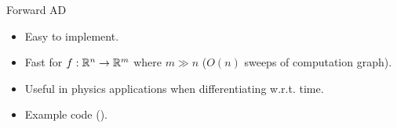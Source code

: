 \begin{frame}{Forward AD}
\begin{itemize}
    \item Easy to implement.
    \item Fast for $f:\mathbb{R}^n \to \mathbb{R}^m$ where $m \gg n$ ($O(n)$ sweeps of computation graph).
    \item Useful in physics applications when differentiating w.r.t. time.
    \item Example code (\href{https://github.com/JamesYang007/FastAD-Report/blob/master/slides/stanford-01272022/examples/src/fwd_ad.cpp}{}).
\end{itemize}
\end{frame}
